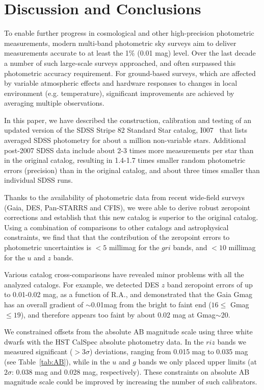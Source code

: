 \documentclass[fleqn,usenatbib]{mnras}
\newcommand{\pO}{\hbox{I007}}
\begin{document}
\section{Discussion and Conclusions} \label{sec:disc}

To enable further progress in cosmological and other high-precision photometric measurements, 
modern multi-band photometric sky surveys aim to deliver measurements accurate to at least the 1\% 
(0.01 mag) level. Over the last decade a number of such large-scale surveys approached, and
often surpassed this photometric accuracy requirement. For ground-based surveys, which are 
affected by variable atmospheric effects and hardware responses to changes in local environment
(e.g. temperature), significant improvements are achieved by averaging multiple observations. 

In this paper, we have described the construction, calibration and testing of an updated version of the
SDSS Stripe 82 Standard Star catalog, \pO\  \citep{Ivez07} that lists averaged SDSS photometry for about
a million non-variable stars. Additional post-2007 SDSS data include about 
2-3 times more measurements per star than in the original catalog, resulting in 1.4-1.7 times smaller 
random photometric errors (precision) than in the original catalog, and about three times smaller than individual SDSS runs.

Thanks to the availability of photometric data from recent wide-field surveys (Gaia, DES, Pan-STARRS
and CFIS), we were able to derive robust zeropoint corrections and establish that this new catalog
is superior to the original catalog. Using a combination of comparisons to other catalogs and 
astrophysical constraints, we find that that the contribution of the zeropoint errors to photometric
uncertainties is $<5$ millimag for the $gri$ bands, and $<10$ millimag for the $u$ and $z$ bands. 

Various catalog cross-comparisons have revealed minor problems with all the analyzed catalogs.
For example, we detected DES $z$ band zeropoint errors of up to 0.01-0.02 mag, as a function 
of R.A., and demonstrated that the Gaia Gmag has an overall gradient of $\sim$0.01mag from the bright to faint end ($ 16 \leq$ Gmag $\leq 19$), and therefore appears too faint by about 0.02 mag at Gmag$\sim$20.
 
We constrained offsets from the absolute AB magnitude scale using three white dwarfs with the 
HST CalSpec absolute photometry data. In the $riz$ bands we measured significant ($>3\sigma$) 
deviations, ranging from 0.015 mag to 0.035 mag (see Table~\ref{tab:AB}), while in the $u$ and $g$ 
bands we only placed upper limits (at $2\sigma$: 0.038 mag and 0.028 mag, respectively). These
constraints on absolute AB magnitude scale could be improved by increasing the number of such 
calibrators.
\end{document}
